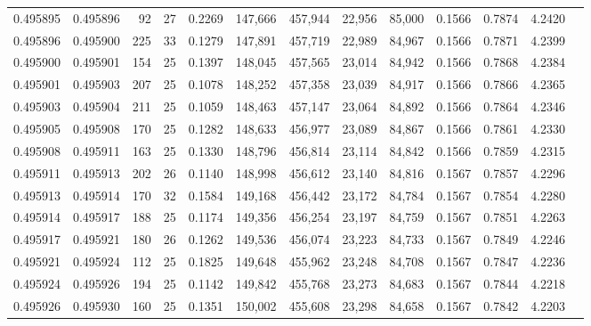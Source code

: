 \begin{tabular}{rrrrrrrrrrrrr}
0.495895 & 0.495896 &  92 &  27 &                                     0.2269 & 147,666 & 457,944 &  22,956 &  85,000 & 0.1566 & 0.7874 & 4.2420 \\
0.495896 & 0.495900 & 225 &  33 &                                     0.1279 & 147,891 & 457,719 &  22,989 &  84,967 & 0.1566 & 0.7871 & 4.2399 \\
0.495900 & 0.495901 & 154 &  25 &                                     0.1397 & 148,045 & 457,565 &  23,014 &  84,942 & 0.1566 & 0.7868 & 4.2384 \\
0.495901 & 0.495903 & 207 &  25 &                                     0.1078 & 148,252 & 457,358 &  23,039 &  84,917 & 0.1566 & 0.7866 & 4.2365 \\
0.495903 & 0.495904 & 211 &  25 &                                     0.1059 & 148,463 & 457,147 &  23,064 &  84,892 & 0.1566 & 0.7864 & 4.2346 \\
0.495905 & 0.495908 & 170 &  25 &                                     0.1282 & 148,633 & 456,977 &  23,089 &  84,867 & 0.1566 & 0.7861 & 4.2330 \\
0.495908 & 0.495911 & 163 &  25 &                                     0.1330 & 148,796 & 456,814 &  23,114 &  84,842 & 0.1566 & 0.7859 & 4.2315 \\
0.495911 & 0.495913 & 202 &  26 &                                     0.1140 & 148,998 & 456,612 &  23,140 &  84,816 & 0.1567 & 0.7857 & 4.2296 \\
0.495913 & 0.495914 & 170 &  32 &                                     0.1584 & 149,168 & 456,442 &  23,172 &  84,784 & 0.1567 & 0.7854 & 4.2280 \\
0.495914 & 0.495917 & 188 &  25 &                                     0.1174 & 149,356 & 456,254 &  23,197 &  84,759 & 0.1567 & 0.7851 & 4.2263 \\
0.495917 & 0.495921 & 180 &  26 &                                     0.1262 & 149,536 & 456,074 &  23,223 &  84,733 & 0.1567 & 0.7849 & 4.2246 \\
0.495921 & 0.495924 & 112 &  25 &                                     0.1825 & 149,648 & 455,962 &  23,248 &  84,708 & 0.1567 & 0.7847 & 4.2236 \\
0.495924 & 0.495926 & 194 &  25 &                                     0.1142 & 149,842 & 455,768 &  23,273 &  84,683 & 0.1567 & 0.7844 & 4.2218 \\
0.495926 & 0.495930 & 160 &  25 &                                     0.1351 & 150,002 & 455,608 &  23,298 &  84,658 & 0.1567 & 0.7842 & 4.2203 \\

\end{tabular}
